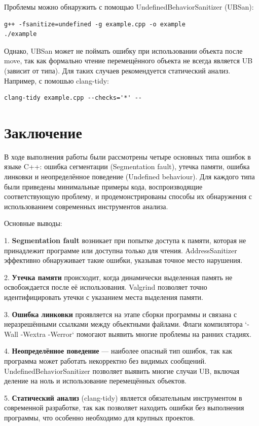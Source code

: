\documentclass[14pt]{extreport}
\begin{document}
Проблемы можно обнаружить с помощью UndefinedBehaviorSanitizer (UBSan):
\begin{verbatim}
g++ -fsanitize=undefined -g example.cpp -o example
./example
\end{verbatim}
Однако, UBSan может не поймать ошибку при использовании объекта после move, так как формально чтение перемещённого объекта не всегда является UB (зависит от типа). Для таких случаев рекомендуется статический анализ. 
Например, с помошью clang-tidy:
\begin{verbatim}
clang-tidy example.cpp --checks='*' --
\end{verbatim}

\newpage
\section*{Заключение}
В ходе выполнения работы были рассмотрены четыре основных типа ошибок в языке C++: ошибка сегментации (Segmentation fault), утечка памяти, ошибка линковки и неопределённое поведение (Undefined behaviour). Для каждого типа были приведены минимальные примеры кода, воспроизводящие соответствующую проблему, и продемонстрированы способы их обнаружения с использованием современных инструментов анализа. 

Основные выводы: 

1. \textbf{Segmentation fault} возникает при попытке доступа к памяти, которая не принадлежит программе или доступна только для чтения. AddressSanitizer эффективно обнаруживает такие ошибки, указывая точное место нарушения.

2. \textbf{Утечка памяти} происходит, когда динамически выделенная память не освобождается после её использования. Valgrind позволяет точно идентифицировать утечки с указанием места выделения памяти.

3. \textbf{Ошибка линковки} проявляется на этапе сборки программы и связана с неразрешёнными ссылками между объектными файлами. Флаги компилятора `-Wall -Wextra -Werror` помогают выявить многие проблемы на ранних стадиях.

4. \textbf{Неопределённое поведение} — наиболее опасный тип ошибок, так как программа может работать некорректно без видимых сообщений. \\
\noindent UndefinedBehaviorSanitizer позволяет выявить многие случаи UB, включая деление на ноль и использование перемещённых объектов.

5. \textbf{Статический анализ} (clang-tidy) является обязательным инструментом в современной разработке, так как позволяет находить ошибки без выполнения программы, что особенно необходимо для крупных проектов.
\end{document}
